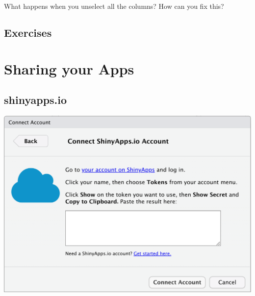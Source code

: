 \documentclass[
]{book}
\begin{document}
What happens when you unselect all the columns? How can you fix this?

\hypertarget{exercises-contingency}{%
\section{Exercises}\label{exercises-contingency}}

\hypertarget{sharing}{%
\chapter{Sharing your Apps}\label{sharing}}

\hypertarget{shinyapps.io}{%
\section{shinyapps.io}\label{shinyapps.io}}

\includegraphics{images/saio_connect.png}
\end{document}
